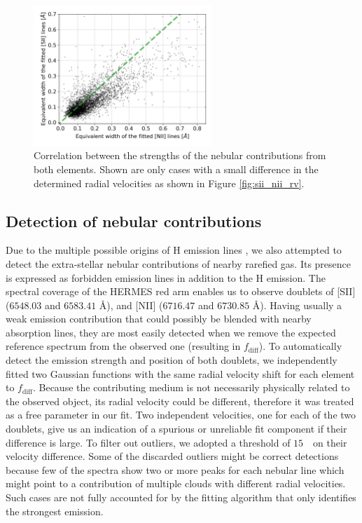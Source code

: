 \begin{figure}
	\centering
	\includegraphics[width=0.6\textwidth]{sii_nii_ew_corr.png}
	\caption{Correlation between the strengths of the nebular contributions from both elements. Shown are only cases with a small difference in the determined radial velocities as shown in Figure \ref{fig:sii_nii_rv}.}
	\label{fig:sii_nii_ew}
\end{figure}

\subsection{Detection of nebular contributions}
\label{sec:nebularemis}
Due to the multiple possible origins of H emission lines \cite{2007ASSL..342.....K}, we also attempted to detect the extra-stellar nebular contributions of nearby rarefied gas. Its presence is expressed as forbidden emission lines in addition to the H emission. The spectral coverage  of the HERMES red arm enables us to observe doublets of [SII] ($6548.03$ and $6583.41$ \AA), and [NII] ($6716.47$ and $6730.85$ \AA). Having usually a weak emission contribution that could possibly be blended with nearby absorption lines, they are most easily detected when we remove the expected reference spectrum from the observed one (resulting in $f_\mathrm{diff}$). To automatically detect the emission strength and position of both doublets, we independently fitted two Gaussian functions with the same radial velocity shift for each element to $f_\mathrm{diff}$. Because the contributing medium is not necessarily physically related to the observed object, its radial velocity could be different, therefore it was treated as a free parameter in our fit. Two independent velocities, one for each of the two doublets, give us an indication of a spurious or unreliable fit component if their difference is large. To filter out outliers, we adopted a threshold of $15$~\kms\ on their velocity difference. Some of the discarded outliers might be correct detections because few of the spectra show two or more peaks for each nebular line which might point to a contribution of multiple clouds with different radial velocities. Such cases are not fully accounted for by the fitting algorithm that only identifies the strongest emission.

